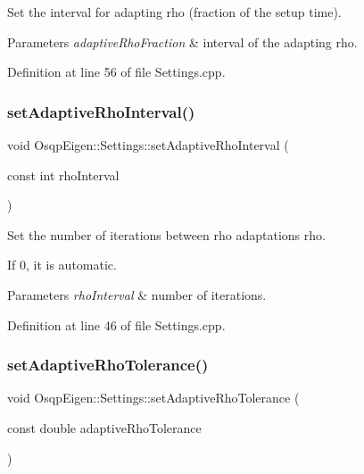 Set the interval for adapting rho (fraction of the setup time). 


\begin{DoxyParams}{Parameters}
{\em adaptive\+Rho\+Fraction} & interval of the adapting rho. \\
\hline
\end{DoxyParams}


Definition at line 56 of file Settings.\+cpp.

\mbox{\label{classOsqpEigen_1_1Settings_a499bb35ff72b900bf0063f7f8be679de}} 
\subsubsection{\texorpdfstring{set\+Adaptive\+Rho\+Interval()}{setAdaptiveRhoInterval()}}
{\footnotesize\ttfamily void Osqp\+Eigen\+::\+Settings\+::set\+Adaptive\+Rho\+Interval (\begin{DoxyParamCaption}\item[{const int}]{rho\+Interval }\end{DoxyParamCaption})}



Set the number of iterations between rho adaptations rho. 

If 0, it is automatic. 
\begin{DoxyParams}{Parameters}
{\em rho\+Interval} & number of iterations. \\
\hline
\end{DoxyParams}


Definition at line 46 of file Settings.\+cpp.

\mbox{\label{classOsqpEigen_1_1Settings_afb3740497a1c9ecef66bc1c142169604}} 
\subsubsection{\texorpdfstring{set\+Adaptive\+Rho\+Tolerance()}{setAdaptiveRhoTolerance()}}
{\footnotesize\ttfamily void Osqp\+Eigen\+::\+Settings\+::set\+Adaptive\+Rho\+Tolerance (\begin{DoxyParamCaption}\item[{const double}]{adaptive\+Rho\+Tolerance }\end{DoxyParamCaption})}



